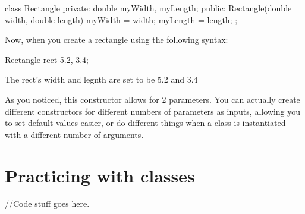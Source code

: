 \documentclass{tufte-handout}
\begin{document}
\begin{Code}
    class Rectangle{
        private:
            double myWidth, myLength;
        public:
            Rectangle(double width, double length){
                myWidth = width;
                myLength = length;
            }
};
\end{Code}
Now, when you create a rectangle using the following syntax:
\begin{Code}
    Rectangle rect {5.2, 3.4};
\end{Code}
The rect's width and legnth are set to be 5.2 and 3.4

As you noticed, this constructor allows for 2 parameters.
You can actually create different constructors for different numbers of parameters as inputs, allowing you to set default values easier, or do different things when a class is instantiated with a different number of arguments.

\section{Practicing with classes}

//Code stuff goes here.
\end{document}
